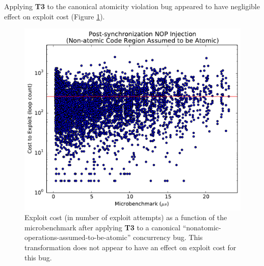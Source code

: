 Applying \textbf{T3} to the canonical atomicity violation bug appeared to have negligible effect on exploit cost (Figure \ref{fig_nonatomic-post}). 
\begin{figure}
	\centering
	\includegraphics[width=.75\columnwidth]{figures/nonatomic-post}
	\caption{
		Exploit cost (in number of exploit attempts) as a function of the microbenchmark after applying \textbf{T3} to a canonical ``nonatomic-operations-assumed-to-be-atomic'' concurrency bug.
		This transformation does not appear to have an effect on exploit cost for this bug.
	}
	\label{fig_nonatomic-post}
\end{figure}
